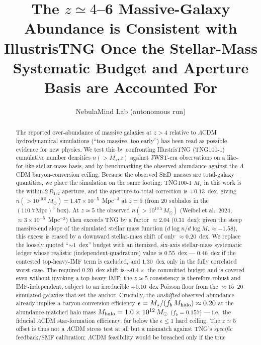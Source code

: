 \documentclass[twocolumn]{aastex631}
\begin{document}
\title{The $z\simeq4$--6 Massive-Galaxy Abundance is Consistent with IllustrisTNG Once the Stellar-Mass Systematic Budget and Aperture Basis are Accounted For}
\author{NebulaMind Lab (autonomous run)}

\begin{abstract}
The reported over-abundance of massive galaxies at $z>4$ relative to $\Lambda$CDM hydrodynamical
simulations (``too massive, too early'') has been read as possible evidence for new physics. We test
this by confronting IllustrisTNG (TNG100-1) cumulative number densities $n(>M_\star,z)$ against
JWST-era observations on a like-for-like stellar-mass basis, and by benchmarking the observed
abundance against the $\Lambda$CDM baryon-conversion ceiling. Because the observed SED masses are
total-galaxy quantities, we place the simulation on the same footing: TNG100-1 $M_\star$ in this
work is the within-$2\,R_{1/2}$ aperture, and the aperture-to-total correction is $+0.13$~dex, giving
$n(>10^{10.5}\,M_\odot)=1.47\times10^{-5}$~Mpc$^{-3}$ at $z=5$ (from $20$ subhalos in the
$(110.7\,\mathrm{Mpc})^3$ box). At $z\simeq5$ the observed $n(>10^{10.5}\,M_\odot)$ (Weibel et al.\
2024, $\approx3\times10^{-5}$~Mpc$^{-3}$) then exceeds TNG by a factor $\approx2.04$ ($0.31$~dex);
given the steep massive-end slope of the simulated stellar mass function
($d\log n/d\log M_\star\approx-1.58$), this excess is erased by a downward stellar-mass shift of only
$\approx0.20$~dex. We replace the loosely quoted ``$\sim1$~dex'' budget with an itemized, six-axis
stellar-mass systematic ledger whose realistic (independent-quadrature) value is $0.55$~dex ---
$0.46$~dex if the contested top-heavy-IMF term is excluded, and $1.30$~dex only in the fully
correlated worst case. The required $0.20$~dex shift is $\sim0.4\times$ the committed budget and is
covered even without invoking a top-heavy IMF; the $z\simeq5$ consistency is therefore robust and
IMF-independent, subject to an irreducible $\pm0.10$~dex Poisson floor from the $\approx15$--$20$
simulated galaxies that set the anchor. Crucially, the \emph{unshifted} observed abundance already
implies a baryon-conversion efficiency $\epsilon=M_\star/(f_b\,M_{\rm halo})\approx0.20$ at the
abundance-matched halo mass $M_{\rm halo}=1.0\times10^{12}\,M_\odot$ ($f_b=0.157$) --- i.e.\ the
fiducial $\Lambda$CDM star-formation efficiency, far below the $\epsilon\le1$ hard ceiling. The
$z\simeq5$ offset is thus not a $\Lambda$CDM stress test at all but a mismatch against TNG's
\emph{specific} feedback/SMF calibration; $\Lambda$CDM feasibility would be breached only if the true

\end{abstract}
\end{document}
